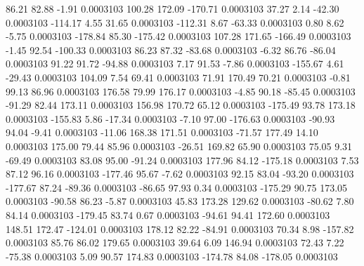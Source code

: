        86.21       82.88       -1.91     0.0003103
      100.28      172.09     -170.71     0.0003103
       37.27        2.14      -42.30     0.0003103
     -114.17        4.55       31.65     0.0003103
     -112.31        8.67      -63.33     0.0003103
        0.80        8.62       -5.75     0.0003103
     -178.84       85.30     -175.42     0.0003103
      107.28      171.65     -166.49     0.0003103
       -1.45       92.54     -100.33     0.0003103
       86.23       87.32      -83.68     0.0003103
       -6.32       86.76      -86.04     0.0003103
       91.22       91.72      -94.88     0.0003103
        7.17       91.53       -7.86     0.0003103
     -155.67        4.61      -29.43     0.0003103
      104.09        7.54       69.41     0.0003103
       71.91      170.49       70.21     0.0003103
       -0.81       99.13       86.96     0.0003103
      176.58       79.99      176.17     0.0003103
       -4.85       90.18      -85.45     0.0003103
      -91.29       82.44      173.11     0.0003103
      156.98      170.72       65.12     0.0003103
     -175.49       93.78      173.18     0.0003103
     -155.83        5.86      -17.34     0.0003103
       -7.10       97.00     -176.63     0.0003103
      -90.93       94.04       -9.41     0.0003103
      -11.06      168.38      171.51     0.0003103
      -71.57      177.49       14.10     0.0003103
      175.00       79.44       85.96     0.0003103
      -26.51      169.82       65.90     0.0003103
       75.05        9.31      -69.49     0.0003103
       83.08       95.00      -91.24     0.0003103
      177.96       84.12     -175.18     0.0003103
        7.53       87.12       96.16     0.0003103
     -177.46       95.67       -7.62     0.0003103
       92.15       83.04      -93.20     0.0003103
     -177.67       87.24      -89.36     0.0003103
      -86.65       97.93        0.34     0.0003103
     -175.29       90.75      173.05     0.0003103
      -90.58       86.23       -5.87     0.0003103
       45.83      173.28      129.62     0.0003103
      -80.62        7.80       84.14     0.0003103
     -179.45       83.74        0.67     0.0003103
      -94.61       94.41      172.60     0.0003103
      148.51      172.47     -124.01     0.0003103
      178.12       82.22      -84.91     0.0003103
       70.34        8.98     -157.82     0.0003103
       85.76       86.02      179.65     0.0003103
       39.64        6.09      146.94     0.0003103
       72.43        7.22      -75.38     0.0003103
        5.09       90.57      174.83     0.0003103
     -174.78       84.08     -178.05     0.0003103
